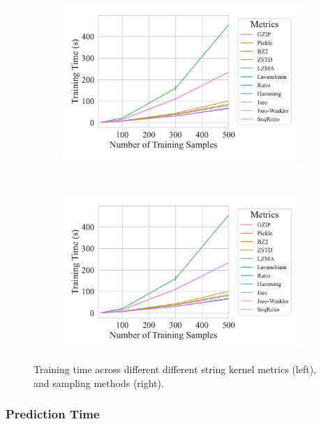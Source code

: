 \begin{figure}
	\begin{subfigure}
		\centering
		\includegraphics[width=.46\textwidth]{figs/kdd_nsl/metric_vs_train_time.pdf}
	\end{subfigure}
	~
	\begin{subfigure}
		\centering
		\includegraphics[width=.46\textwidth]{figs/kdd_nsl/metric_vs_train_time.pdf}
	\end{subfigure}
	\caption{Training time across different different string kernel metrics (left), and sampling methods (right).}
	\label{fig:training_time_kdd}
\end{figure}

\subsubsection{Prediction Time}

